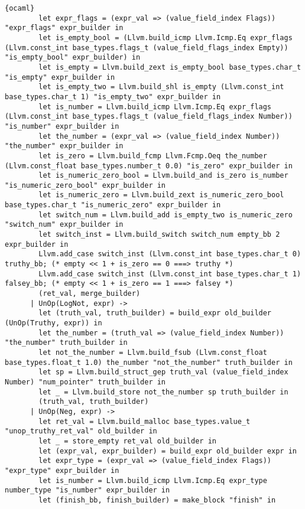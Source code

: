 \begin{lstlisting}{ocaml}
        let expr_flags = (expr_val => (value_field_index Flags)) "expr_flags" expr_builder in
        let is_empty_bool = (Llvm.build_icmp Llvm.Icmp.Eq expr_flags (Llvm.const_int base_types.flags_t (value_field_flags_index Empty)) "is_empty_bool" expr_builder) in
        let is_empty = Llvm.build_zext is_empty_bool base_types.char_t "is_empty" expr_builder in
        let is_empty_two = Llvm.build_shl is_empty (Llvm.const_int base_types.char_t 1) "is_empty_two" expr_builder in
        let is_number = Llvm.build_icmp Llvm.Icmp.Eq expr_flags (Llvm.const_int base_types.flags_t (value_field_flags_index Number)) "is_number" expr_builder in
        let the_number = (expr_val => (value_field_index Number)) "the_number" expr_builder in
        let is_zero = Llvm.build_fcmp Llvm.Fcmp.Oeq the_number (Llvm.const_float base_types.number_t 0.0) "is_zero" expr_builder in
        let is_numeric_zero_bool = Llvm.build_and is_zero is_number "is_numeric_zero_bool" expr_builder in
        let is_numeric_zero = Llvm.build_zext is_numeric_zero_bool base_types.char_t "is_numeric_zero" expr_builder in
        let switch_num = Llvm.build_add is_empty_two is_numeric_zero "switch_num" expr_builder in
        let switch_inst = Llvm.build_switch switch_num empty_bb 2 expr_builder in
        Llvm.add_case switch_inst (Llvm.const_int base_types.char_t 0) truthy_bb; (* empty << 1 + is_zero == 0 ===> truthy *)
        Llvm.add_case switch_inst (Llvm.const_int base_types.char_t 1) falsey_bb; (* empty << 1 + is_zero == 1 ===> falsey *)
        (ret_val, merge_builder)
      | UnOp(LogNot, expr) ->
        let (truth_val, truth_builder) = build_expr old_builder (UnOp(Truthy, expr)) in
        let the_number = (truth_val => (value_field_index Number)) "the_number" truth_builder in
        let not_the_number = Llvm.build_fsub (Llvm.const_float base_types.float_t 1.0) the_number "not_the_number" truth_builder in
        let sp = Llvm.build_struct_gep truth_val (value_field_index Number) "num_pointer" truth_builder in
        let _ = Llvm.build_store not_the_number sp truth_builder in
        (truth_val, truth_builder)
      | UnOp(Neg, expr) ->
        let ret_val = Llvm.build_malloc base_types.value_t "unop_truthy_ret_val" old_builder in
        let _ = store_empty ret_val old_builder in
        let (expr_val, expr_builder) = build_expr old_builder expr in
        let expr_type = (expr_val => (value_field_index Flags)) "expr_type" expr_builder in
        let is_number = Llvm.build_icmp Llvm.Icmp.Eq expr_type number_type "is_number" expr_builder in
        let (finish_bb, finish_builder) = make_block "finish" in


\end{lstlisting}
